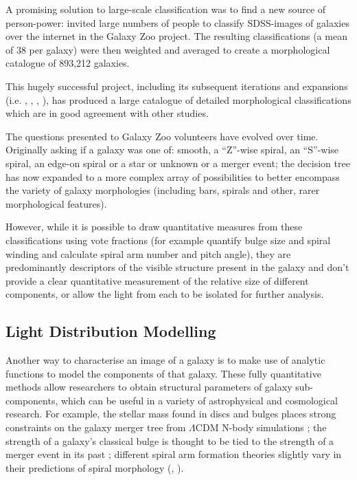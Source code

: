 \documentclass[../main.tex]{subfiles}
\begin{document}

A promising solution to large-scale classification was to find a new source of person-power: \cite{Lintott2008:0804.4483v1} invited large numbers of people to classify SDSS-images of galaxies over the internet in the Galaxy Zoo project. The resulting classifications (a mean of 38 per galaxy) were then weighted and averaged to create a morphological catalogue of 893,212 galaxies.

This hugely successful project, including its subsequent iterations and expansions (i.e. \citealt{Willett2013:1308.3496v2}, \citealt{2017MNRAS.464.4176W}, \citealt{2017MNRAS.464.4420S}, \citealt{Hart2016:1607.01019v1}), has produced a large catalogue of detailed morphological classifications which are in good agreement with other studies.

The questions presented to Galaxy Zoo volunteers have evolved over time. Originally asking if a galaxy was one of: smooth, a ``Z''-wise spiral, an ``S''-wise spiral, an edge-on spiral or a star or unknown or a merger event; the decision tree has now expanded to a more complex array of possibilities to better encompass the variety of galaxy morphologies (including bars, spirals and other, rarer morphological features).

However, while it is possible to draw quantitative measures from these classifications using vote fractions (for example \citealt{Masters2019:1904.11436v1} quantify bulge size and spiral winding and \citealt{2017MNRAS.472.2263H} calculate spiral arm number and pitch angle), they are predominantly descriptors of the visible structure present in the galaxy and don't provide a clear quantitative measurement of the relative size of different components, or allow the light from each to be isolated for further analysis.

\subsection{Light Distribution Modelling}

Another way to characterise an image of a galaxy is to make use of analytic functions to model the components of that galaxy. These fully quantitative methods allow researchers to obtain structural parameters of galaxy sub-components, which can be useful in a variety of astrophysical and cosmological research. For example, the stellar mass found in discs and bulges places strong constraints on the galaxy merger tree from $\Lambda\mathrm{CDM}$ N-body simulations \citep{Hopkins2010:1004.2708v3}; the strength of a galaxy's classical bulge is thought to be tied to the strength of a merger event in its past \citep{Kormendy2010:1009.3015v1}; different spiral arm formation theories slightly vary in their predictions of spiral morphology (\citealt{Dobbs2014:1407.5062v1}, \citealt{Pour-Imani2016:1608.00969v1} \citealt{2017MNRAS.472.2263H}).
\end{document}
